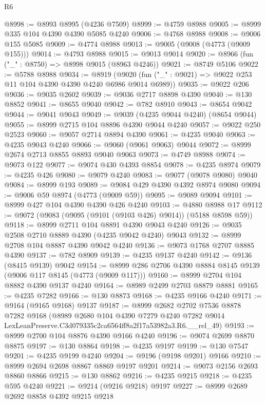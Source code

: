 \begin{lexlean}{R6}
\begin{coremodule}
@8998 := @8993 @8995 (@4236 @7509)
@8999 := @4759 @8988
@9005 := @8999 @335 @104 @4390 @4390 @5085 @4240
@9006 := @4768 @8988
@9008 := @9006 @155 @5085
@9009 := @4774 @8988
@9013 := @9005 (@9008 (@4773 (@9009 @155)))
@9014 := @4793 @8988
@9015 := @9013 @9014
@9020 := @8966 (fun ("_" : @8750) => @8998 @9015 (@8963 @4246))
@9021 := @8749 @5106
@9022 := @5788 @8988
@9034 := @8919
    (@9020 (fun ("_" : @9021) => @9022 @253 @11 @104 @4390 @4390 @4240 @6986 @9014 @6989))
@9035 := @9022 @206
@9036 := @9035 @2602
@9039 := @9036 @2717 @8898 @4390
@9040 := @130 @8852
@9041 := @8655 @9040
@9042 := @782 @8910
@9043 := @8654 @9042
@9044 := @9041 @9043
@9049 := @9039 (@4235 @9044 @4240) (@8654 @9044)
@9055 := @8999 @2715 @104 @8896 @4390 @9044 @4240
@9057 := @9022 @250 @2523
@9060 := @9057 @2714 @8894 @4390
@9061 := @4235 @9040
@9063 := @4235 @9043 @4240
@9066 := @9060 (@9061 @9063) @9044
@9072 := @8999 @2674 @2713 @8855 @8893 @9040 @9063
@9073 := @4749 @8988
@9074 := @9073 @122
@9077 := @9074 @430 @4393 @8854
@9078 := @4235 @8974
@9079 := @4235 @426
@9080 := @9079 @4240
@9083 := @9077 (@9078 @9080) @9040
@9084 := @8999 @193
@9089 := @9084 @429 @4390 @4392 @8974 @9080
@9094 := @9006 @59 @8974 (@4773 (@9009 @59))
@9095 := @9089 @9094
@9101 := @8999 @427 @104 @4390 @4390 @426 @4240
@9103 := @4880 @8988 @17
@9112 := @9072 (@9083 (@9095 (@9101 (@9103 @426) @9014)) (@5188 @8598 @59))
@9118 := @8999 @2711 @104 @8891 @4390 @9043 @4240
@9126 := @9035 @2508 @2710 @8889 @4390 (@4235 @9042 @4240) @9043
@9132 := @8999 @2708 @104 @8887 @4390 @9042 @4240
@9136 := @9073 @1768 @2707 @8885 @4390
@9137 := @782 @8909
@9139 := @4235 @9137 @4240
@9142 := @9136 (@8415 @9139) @9042
@9154 := @8999 @286 @2706 @4390 @8884 @8145 @9139 (@9006 @117 @8145 (@4773 (@9009 @117)))
@9160 := @8999 @2704 @104 @8882 @4390 @9137 @4240
@9164 := @8989 @2499 @2703 @8879 @8881
@9165 := @4235 @7282
@9166 := @130 @8873
@9168 := @4235 @9166 @4240
@9171 := @9164 (@9165 @9168) @9137
@9187 := @8999
    @2682
    @2702
    @7536
    @8878
    @7282
    @9168
    (@8989
      @2680
      @104
      @4390
      @7279
      @4240
      @7282
      @9014
      LexLeanPreserve.C3d079335c2ca6564ff8a2f17a53982a3.R6.__rel_49)
@9193 := @8999 @2700 @104 @8876 @4390 @9166 @4240
@9196 := @9074 @2699 @8870 @8875
@9197 := @130 @8864
@9198 := @4235 @9197
@9199 := @130 @7547
@9201 := @4235 @9199 @4240
@9204 := @9196 (@9198 @9201) @9166
@9210 := @8999 @2694 @2698 @8867 @8869 @9197 @9201
@9214 := @9073 @2156 @2693 @8860 @8866
@9215 := @130 @8862
@9216 := @4235 @9215
@9218 := @4235 @595 @4240
@9221 := @9214 (@9216 @9218) @9197
@9227 := @8999 @2689 @2692 @8858 @4392 @9215 @9218

\end{coremodule}
\end{lexlean}

